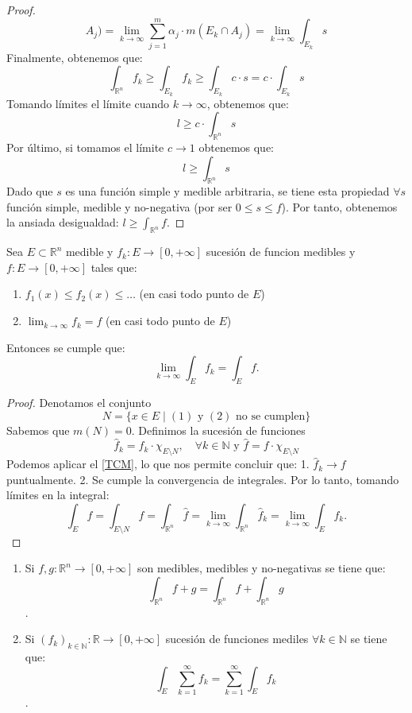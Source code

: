 \begin{proof}
$$        A_j) = \lim\limits_{k \to \infty} \sum_{j=1}^{m} \alpha_j \cdot m(E_k \cap A_j)
        = \lim\limits_{k \to \infty} \int_{E_k} s$$ Finalmente, obtenemos que: $$
        \int_{\mathbb{R}^n}f_k \geq \int_{E_k} f_k \geq \int_{E_k} c \cdot s = c \cdot
        \int_{E_k} s$$ Tomando límites el límite cuando $k \to \infty$, obtenemos que:
    $$ l \geq c \cdot \int_{\mathbb{R}^n} s$$ Por último, si tomamos el límite $c
        \to 1$ obtenemos que: $$ l \geq \int_{\mathbb{R}^n} s$$ Dado que $s$ es una
    función simple y medible arbitraria, se tiene esta propiedad $\forall s$
    función simple, medible y no-negativa (por ser $0 \leq s \leq f$). Por tanto,
    obtenemos la ansiada desigualdad: $l \geq \int_{\mathbb{R}^n} f$.
\end{proof}
\begin{teorema} 
    Sea $E \subset \mathbb{R}^n$ medible y $f_k: E \to [0, +\infty]$ sucesión de funcion medibles y $f: E \to [0, +\infty]$ tales que:
    \begin{enumerate}
        \item $f_1(x) \leq f_2(x) \leq \dots$ (en casi todo punto de $E$)
        \item $\lim_{k \to \infty}f_k = f$ (en casi todo punto de $E$)
    \end{enumerate}
    Entonces se cumple que: $$\lim_{k \to \infty}\int_{E}f_k = \int_{E}f.$$
\end{teorema}
\begin{proof}
    Denotamos el conjunto $$ N = \{ x \in E \mid (1) \text{ y } (2) \text{ no se cumplen} \} $$
    Sabemos que \( m(N) = 0 \). Definimos la sucesión de funciones $$ \hat{f}_k = f_k \cdot \chi_{E \setminus  N}, \quad \forall k \in \mathbb{N} \text{ y } \hat{f} = f \cdot \chi_{E\setminus N}$$
    Podemos aplicar el \cref{TCM}, lo que nos permite concluir que:
    1. \( \hat{f}_k \to f \) puntualmente.
    2. Se cumple la convergencia de integrales.
    Por lo tanto, tomando límites en la integral:
    $$ \int_E f = \int_{E \setminus N} f = \int_{\mathbb{R}^n}\hat{f} = \lim_{k \to \infty} \int_{\mathbb{R}^n} \hat{f}_k = \lim_{k \to \infty} \int_E f_k. $$
\end{proof}
\begin{corolario}
    \vspace{-2.5em}
    \begin{enumerate}
        \item Si $f, g: \mathbb{R}^n \to [0, +\infty]$ son medibles, medibles y no-negativas se tiene que:
              $$\int_{\mathbb{R}^n}f+g = \int_{\mathbb{R}^n}f +
                  \int_{\mathbb{R}^n}g$$.
        \item Si $(f_k)_{k\in \mathbb{N}}: \mathbb{R} \to [0, +\infty]$ sucesión de funciones
              mediles $\forall k \in \mathbb{N}$ se tiene que: $$\int_{E}\sum_{k=1}^{\infty}f_k =
                  \sum_{k=1}^{\infty}\int_{E}f_k$$.
    \end{enumerate}
\end{corolario}
